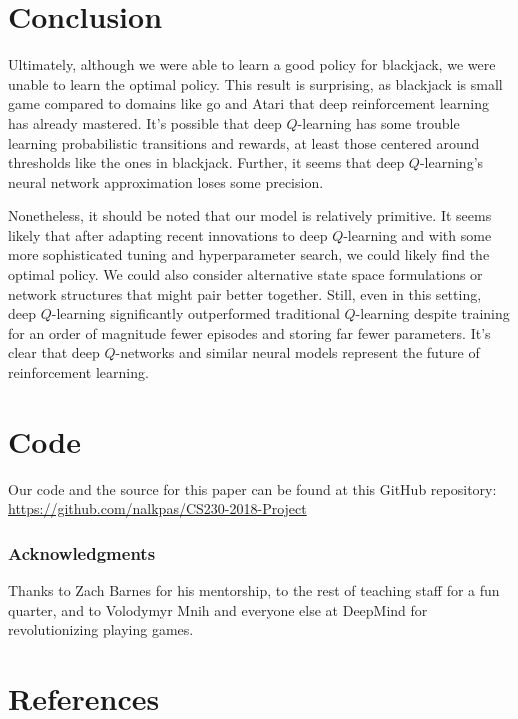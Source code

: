 \documentclass{article}
\begin{document}
\section{Conclusion}

Ultimately, although we were able to learn a good policy for blackjack, we were unable to learn the optimal policy. This result is surprising, as blackjack is small game compared to domains like go and Atari that deep reinforcement learning has already mastered. It's possible that deep $Q$-learning has some trouble learning probabilistic transitions and rewards, at least those centered around thresholds like the ones in blackjack. Further, it seems that deep $Q$-learning's neural network approximation loses some precision. 

Nonetheless, it should be noted that our model is relatively primitive. It seems likely that after adapting recent innovations to deep $Q$-learning and with some more sophisticated tuning and hyperparameter search, we could likely find the optimal policy. We could also consider alternative state space formulations or network structures that might pair better together. Still, even in this setting, deep $Q$-learning significantly outperformed traditional $Q$-learning despite training for an order of magnitude fewer episodes and storing far fewer parameters. It's clear that deep $Q$-networks and similar neural models represent the future of reinforcement learning. 

\section{Code}

Our code and the source for this paper can be found at this GitHub repository: \url{https://github.com/nalkpas/CS230-2018-Project}

\subsubsection*{Acknowledgments}

Thanks to Zach Barnes for his mentorship, to the rest of teaching staff for a fun quarter, and to Volodymyr Mnih and everyone else at DeepMind for revolutionizing playing games. 

\section*{References}

\small
\end{document}
